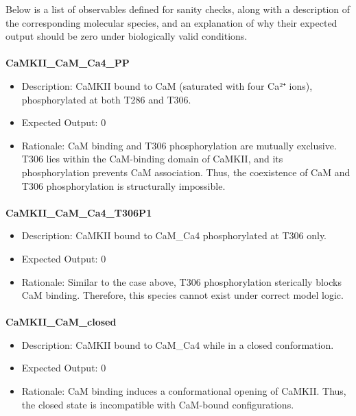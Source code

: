 \documentclass[
  11pt,
  letterpaper,
]{scrreprt}
\makeatletter
\let\oldparagraph\paragraph
\renewcommand{\paragraph}{
    \@ifstar
      \xxxParagraphStar
      \xxxParagraphNoStar
  }
\newcommand{\xxxParagraphStar}[1]{\oldparagraph*{#1}\mbox{}}
\newcommand{\xxxParagraphNoStar}[1]{\oldparagraph{#1}\mbox{}}
\providecommand{\tightlist}{%
  \setlength{\itemsep}{0pt}\setlength{\parskip}{0pt}}\usepackage{longtable,booktabs,array}
\makeatother
\begin{document}
Below is a list of observables defined for sanity checks, along with a
description of the corresponding molecular species, and an explanation
of why their expected output should be zero under biologically valid
conditions.

\paragraph{\texorpdfstring{\textbf{CaMKII\_CaM\_Ca4\_PP}}{CaMKII\_CaM\_Ca4\_PP}}\label{camkii_cam_ca4_pp}

\begin{itemize}
\tightlist
\item
  Description: CaMKII bound to CaM (saturated with four Ca²⁺ ions),
  phosphorylated at both T286 and T306.
\item
  Expected Output: 0
\item
  Rationale: CaM binding and T306 phosphorylation are mutually
  exclusive. T306 lies within the CaM-binding domain of CaMKII, and its
  phosphorylation prevents CaM association. Thus, the coexistence of CaM
  and T306 phosphorylation is structurally impossible.
\end{itemize}

\paragraph{\texorpdfstring{\textbf{CaMKII\_CaM\_Ca4\_T306P1}}{CaMKII\_CaM\_Ca4\_T306P1}}\label{camkii_cam_ca4_t306p1}

\begin{itemize}
\tightlist
\item
  Description: CaMKII bound to CaM\_Ca4 phosphorylated at T306 only.
\item
  Expected Output: 0
\item
  Rationale: Similar to the case above, T306 phosphorylation sterically
  blocks CaM binding. Therefore, this species cannot exist under correct
  model logic.
\end{itemize}

\paragraph{\texorpdfstring{\textbf{CaMKII\_CaM\_closed}}{CaMKII\_CaM\_closed}}\label{camkii_cam_closed}

\begin{itemize}
\tightlist
\item
  Description: CaMKII bound to CaM\_Ca4 while in a closed conformation.
\item
  Expected Output: 0
\item
  Rationale: CaM binding induces a conformational opening of CaMKII.
  Thus, the closed state is incompatible with CaM-bound configurations.
\end{itemize}
\end{document}

